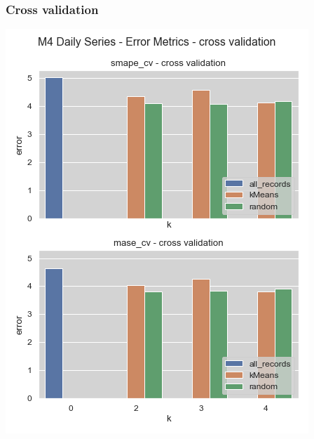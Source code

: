 \documentclass[11pt]{article}
\begin{document}
\subsubsection*{Cross validation}
\label{sec:orgeaee3a9}
\begin{center}
\includegraphics[width=.9\linewidth]{./img/daily_cv_results.png}
\end{center}
\end{document}
